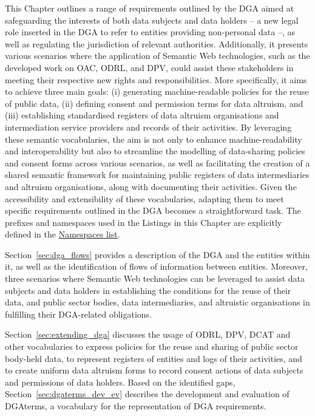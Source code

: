This Chapter outlines a range of requirements outlined by the DGA aimed at safeguarding the interests of both data subjects and data holders -- a new legal role inserted in the DGA to refer to entities providing non-personal data --, as well as regulating the jurisdiction of relevant authorities. 
Additionally, it presents various scenarios where the application of Semantic Web technologies, such as the developed work on OAC, ODRL, and DPV, could assist these stakeholders in meeting their respective new rights and responsibilities.
More specifically, it aims to achieve three main goals: (i) generating machine-readable policies for the reuse of public data, (ii) defining consent and permission terms for data altruism, and (iii) establishing standardised registers of data altruism organisations and intermediation service providers and records of their activities.
By leveraging these semantic vocabularies, the aim is not only to enhance machine-readability and interoperability but also to streamline the modelling of data-sharing policies and consent forms across various scenarios, as well as facilitating the creation of a shared semantic framework for maintaining public registers of data intermediaries and altruism organisations, along with documenting their activities.
Given the accessibility and extensibility of these vocabularies, adapting them to meet specific requirements outlined in the DGA becomes a straightforward task.
The prefixes and namespaces used in the Listings in this Chapter are explicitly defined in the \hyperref[sec:namespaces]{Namespaces list}.

Section~\ref{sec:dga_flows} provides a description of the DGA and the entities within it, as well as the identification of flows of information between entities.
Moreover, three scenarios where Semantic Web technologies can be leveraged to assist data subjects and data holders in establishing the conditions for the reuse of their data, and public sector bodies, data intermediaries, and altruistic organisations in fulfilling their DGA-related obligations. 

Section~\ref{sec:extending_dga} discusses the usage of ODRL, DPV, DCAT and  other vocabularies to express policies for the reuse and sharing of public sector body-held data, to represent registers of entities and logs of their activities, and to create uniform data altruism forms to record consent actions of data subjects and permissions of data holders.
Based on the identified gaps, Section~\ref{sec:dgaterms_dev_ev} describes the development and evaluation of DGAterms, a vocabulary for the representation of DGA requirements.

